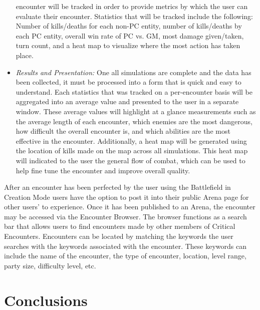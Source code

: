 \documentclass[letterpaper, 10 pt, conference]{ieeeconf}
\begin{document}
\begin{itemize}
	encounter will be tracked in order to provide metrics by which the user can evaluate
	their encounter. Statistics that will be tracked include the following: Number of kills/deaths for each non-PC entity, number of kills/deaths by each PC entity, overall win rate of PC vs. GM, most damage given/taken, turn count, and a heat map to visualize where the most action has taken place. \\
	\item \textit{Results and Presentation:} One all simulations are complete and the data has been collected, it must be
	processed into a form that is quick and easy to understand. Each statistics that
	was tracked on a per-encounter basis will be aggregated into an average value and
	presented to the user in a separate window. These average values will highlight
	at a glance measurements such as the average length of each encounter, which
	enemies are the most dangerous, how difficult the overall encounter is, and which
	abilities are the most effective in the encounter. Additionally, a heat map will be
	generated using the location of kills made on the map across all simulations. This
	heat map will indicated to the user the general flow of combat, which can be used
	to help fine tune the encounter and improve overall quality.
\end{itemize}
After an encounter has been perfected by the user using the Battlefield in
Creation Mode users have the option to post it into their public Arena page for
other users’ to experience. Once it has been published to an Arena, the encounter
may be accessed via the Encounter Browser. The browser functions as a search bar
that allows users to find encounters made by other members of Critical Encounters.
Encounters can be located by matching the keywords the user searches with the
keywords associated with the encounter. These keywords can include the name
of the encounter, the type of encounter, location, level range, party size, difficulty
level, etc.

\section{Conclusions}
\end{document}
